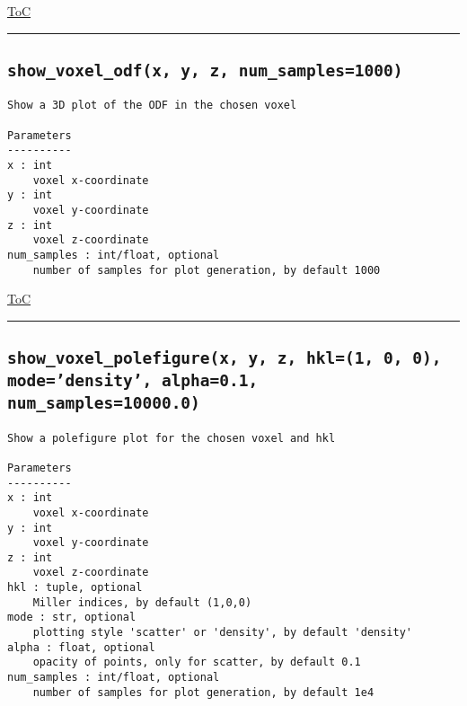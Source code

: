 \documentclass{article}
\begin{document}
\begin{flushright}

\hyperref[toc]{ToC}

\end{flushright}



\vspace{5mm}

\hrule

\subsection*{\texttt{show\_voxel\_odf(x, y, z, num\_samples=1000)}}

\begin{lstlisting}[language=docstring]
Show a 3D plot of the ODF in the chosen voxel

Parameters
----------
x : int
    voxel x-coordinate
y : int
    voxel y-coordinate
z : int
    voxel z-coordinate
num_samples : int/float, optional
    number of samples for plot generation, by default 1000
\end{lstlisting}

\begin{flushright}

\hyperref[toc]{ToC}

\end{flushright}



\vspace{5mm}

\hrule

\subsection*{\texttt{show\_voxel\_polefigure(x, y, z, hkl=(1, 0, 0), mode='density', alpha=0.1, num\_samples=10000.0)}}

\begin{lstlisting}[language=docstring]
Show a polefigure plot for the chosen voxel and hkl

Parameters
----------
x : int
    voxel x-coordinate
y : int
    voxel y-coordinate
z : int
    voxel z-coordinate
hkl : tuple, optional
    Miller indices, by default (1,0,0)
mode : str, optional
    plotting style 'scatter' or 'density', by default 'density'
alpha : float, optional
    opacity of points, only for scatter, by default 0.1
num_samples : int/float, optional
    number of samples for plot generation, by default 1e4
\end{lstlisting}
\end{document}
